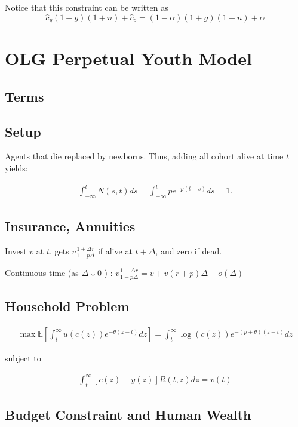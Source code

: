 \documentclass[10pt]{article}
\begin{document}
Notice that this constraint can be written as
$$
\hat{c}_y(1+g)(1+n)+\hat{c}_o=(1-\alpha)(1+g)(1+n)+\alpha
$$

\section{OLG Perpetual Youth Model}

\subsection{Terms}



\subsection{Setup}

Agents that die replaced by newborns. Thus, 
adding all cohort alive at time $t$ yields:

\begin{align}
    \int_{-\infty}^t N(s, t) d s=\int_{-\infty}^t p e^{-p(t-s)} d s=1 .
\end{align}

\subsection{Insurance, Annuities}

Invest $v$ at $t$, gets $v \frac{1+\Delta r}{1-p \Delta}$ if alive at $t+\Delta$, and zero if dead.

Continuous time (as $\Delta \downarrow 0$ ) : $v \frac{1+\Delta r}{1-p \Delta}=v+v(r+p) \Delta+o(\Delta)$

\subsection{Household Problem}

\begin{align}
    \max \mathbb{E}\left[\int_t^{\infty} u(c(z)) e^{-\theta(z-t)} d z\right]=\int_t^{\infty} \log (c(z)) e^{-(p+\theta)(z-t)} d z
\end{align}

subject to 

\begin{align}
    \int_t^{\infty}[c(z)-y(z)] R(t, z) d z=v(t)
\end{align}

\subsection{Budget Constraint and Human Wealth}
\end{document}
